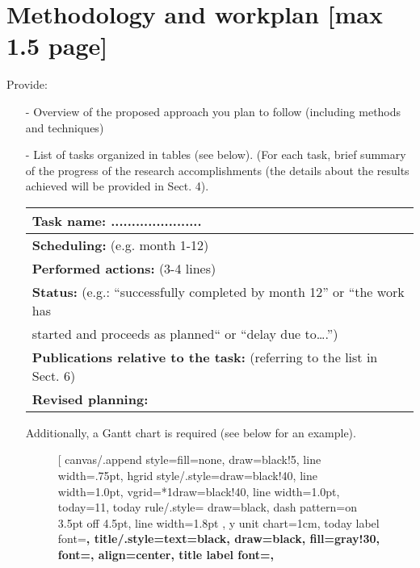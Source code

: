 \documentclass[11pt,a4paper]{article}
\begin{document}
\section{Methodology and workplan [max 1.5 page]}
Provide: 
\begin{itemize}
\item[-] Overview of the proposed approach you plan to follow (including methods and techniques)
\item[-] List of tasks organized in tables (see below). (For each task, brief summary of the progress of the research accomplishments (the details about the results achieved will be provided in Sect. 4). 

\begin{table}[h]
	\begin{center}
	\renewcommand{\arraystretch}{1.3} %
	\setlength{\tabcolsep}{8pt} %
	\begin{tabular}{|P{15cm}|}
		\hline
		\textbf{Task name: ......................} \\ \hline
		\textbf{Scheduling: }(e.g. month 1-12) \\ \hline
		\textbf{Performed actions: }(3-4 lines)\\
		\hline
		\textbf{Status: }(e.g.: “successfully completed by month 12” or “the work has \\ started and proceeds as planned“ or “delay due to….”)\\
		\hline
		\textbf{Publications relative to the task: } (referring to the list in Sect. 6)\\
		\hline
		\textbf{Revised planning: }\\
		\hline
	\end{tabular}
\end{center}
\end{table}
Additionally, a Gantt chart is required (see below for an example).
\begin{figure}[h]
	\begin{center}
		\begin{ganttchart}[
			canvas/.append style={fill=none, draw=black!5, line width=.75pt},
			hgrid style/.style={draw=black!40, line width=1.0pt},
			vgrid={*1{draw=black!40, line width=1.0pt}},
			today=11,
			today rule/.style={
				draw=black,
				dash pattern=on 3.5pt off 4.5pt,
				line width=1.8pt
			},
			y unit chart=1cm,
			today label font=\footnotesize\bfseries,
			title/.style={text=black, draw=black, fill=gray!30, font=\Large\bfseries, align=center},
			title label font=\bfseries\footnotesize,

\end{ganttchart}
\end{center}
\end{figure}
\end{itemize}
\end{document}

